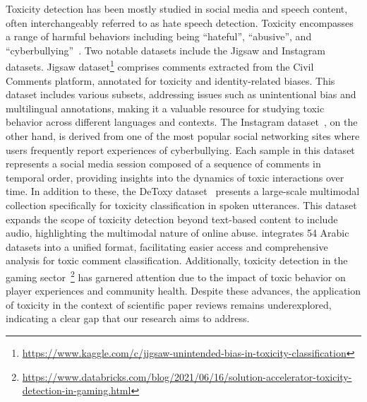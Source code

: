 
Toxicity detection has been mostly studied  in social media and speech content, often interchangeably referred to as hate speech detection. 
Toxicity encompasses a range of harmful behaviors including being ``hateful'', ``abusive'', and ``cyberbullying''~\cite{cheng2022bias}. 
Two notable datasets include the Jigsaw and Instagram datasets. 
Jigsaw dataset\footnote{\url{https://www.kaggle.com/c/jigsaw-unintended-bias-in-toxicity-classification}} comprises comments extracted from the Civil Comments platform, annotated for toxicity and identity-related biases. This dataset includes various subsets, addressing issues such as unintentional bias and multilingual annotations, making it a valuable resource for studying toxic behavior across different languages and contexts. 
The Instagram dataset~\cite{hosseinmardi2015detection}, on the other hand, is derived from one of the most popular social networking sites where users frequently report experiences of cyberbullying. Each sample in this dataset represents a social media session composed of a sequence of comments in temporal order, providing insights into the dynamics of toxic interactions over time. In addition to these, the DeToxy dataset~\cite{ghosh2021detoxy} presents a large-scale multimodal collection specifically for toxicity classification in spoken utterances. This dataset expands the scope of toxicity detection beyond text-based content to include audio, highlighting the multimodal nature of online abuse. \citet{bensalem2024toxic} integrates 54 Arabic datasets into a unified format, facilitating easier access and comprehensive analysis for toxic comment classification. 
Additionally, toxicity detection in the gaming sector~\footnote{\url{https://www.databricks.com/blog/2021/06/16/solution-accelerator-toxicity-detection-in-gaming.html}} has garnered attention due to the impact of toxic behavior on player experiences and community health. Despite these advances, the application of toxicity  in the context of scientific paper reviews remains underexplored, indicating a clear gap that our research aims to address.


